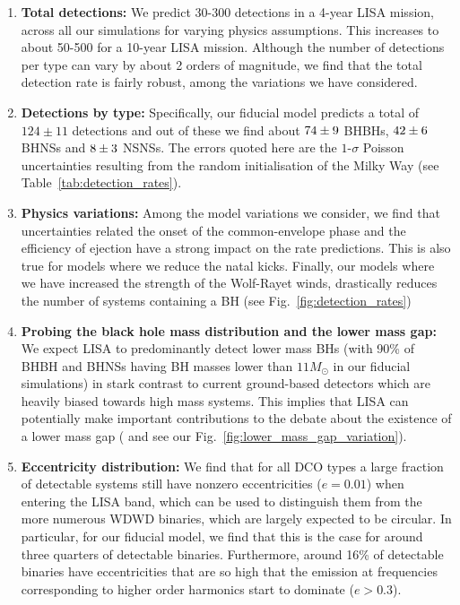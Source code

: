 \begin{enumerate}
    \item \textbf{Total detections:} We predict 30-300 detections in a 4-year LISA mission, across all our simulations for varying physics assumptions. This increases to about 50-500 for a 10-year LISA mission. Although the number of detections per type can vary by about 2 orders of magnitude, we find that the total detection rate is fairly robust, among the variations we have considered.
    
     \item \textbf{Detections by type:} Specifically, our fiducial model predicts a total of $124 \pm 11$ detections and out of these we find about $74{}\pm 9$ BHBHs, $42{}\pm 6$ BHNSs and $8{}\pm 3$ NSNSs. The errors quoted here are the $1$-$\sigma$ Poisson uncertainties resulting from the random initialisation of the Milky Way (see Table~\ref{tab:detection_rates}).
    
    \item \textbf{Physics variations:}  Among the model variations we consider, we find that uncertainties related the onset of the common-envelope phase and the efficiency of ejection have a strong impact on the rate predictions. This is also true for models where we reduce the natal kicks. Finally, our models where we have increased the strength of the Wolf-Rayet winds, drastically reduces the number of systems containing a BH (see Fig.~\ref{fig:detection_rates})
    
    \item \textbf{Probing the black hole mass distribution and the lower mass gap:} We expect LISA to predominantly detect lower mass BHs (with 90\% of BHBH and BHNSs having BH masses lower than $11 \unit{M_\odot}$ in our fiducial simulations) in stark contrast to current ground-based detectors which are heavily biased towards high mass systems. This implies that LISA can potentially make important contributions to the debate about the existence of a lower mass gap (\citealt{Shao+2021} and see our Fig.~\ref{fig:lower_mass_gap_variation}).
    
    \item \textbf{Eccentricity distribution:} We find that for all DCO types a large fraction of detectable systems still have nonzero eccentricities ($e = 0.01$) when entering the LISA band, which can be used to distinguish them from the more numerous WDWD binaries, which are largely expected to be circular. In particular, for our fiducial model, we find that this is the case for around three quarters of detectable binaries. Furthermore, around 16\% of detectable binaries have eccentricities that are so high that the emission at frequencies corresponding to higher order harmonics start to dominate ($e > 0.3$).
    

\end{enumerate}
